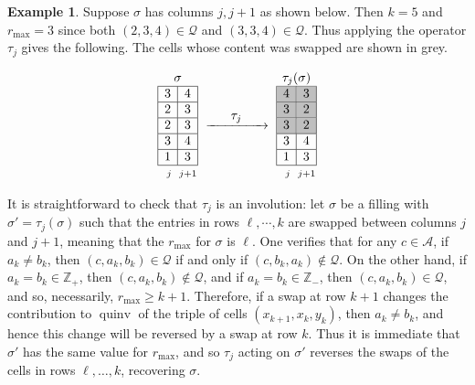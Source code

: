 \documentclass[11pt]{article}
\theoremstyle{definition}
\newtheorem{example}[theo]{Example}
\numberwithin{equation}{section}
\DeclareMathOperator{\quinv}{quinv}
\newcommand{\cQ}{\mathcal{Q}}
\begin{document}
\begin{example}\label{ex:tau}
Suppose $\sigma$ has columns $j,j+1$ as shown below. Then $k=5$ and $r_{\max}=3$ since both $(2,3,4)\in\cQ$ and $(3,3,4)\in\cQ$. Thus applying the operator $\tau_j$ gives the following. The cells whose content was swapped are shown in grey.


\begin{equation*}
\renewcommand{\arraystretch}{1}  
\setlength{\arraycolsep}{1pt} 
\begin{array}{|c|c|}
\multicolumn{2}{c}{\sigma}
\\
\hline
3 &  4\\
\hline
2 & 3  \\
\hline
2 & 3 \\
\hline
3 & 4\\
\hline
1 & 3 \\
\hline
\multicolumn{1}{c}{\scriptstyle \phantom{+} j\phantom{1}}&
\multicolumn{1}{c}{\scriptstyle j+1}
\end{array}
\,\,\xrightarrow{\makebox[1.5cm]{$\tau_j$}}\,\,
\begin{array}{|c|c|}
\multicolumn{2}{c}{\tau_j(\sigma)}
\\
\hline
\cellcolor{gray!50}4 & \cellcolor{gray!50} 3\\
\hline
\cellcolor{gray!50}3 & \cellcolor{gray!50}2  \\
\hline
\cellcolor{gray!50}3 & \cellcolor{gray!50}2 \\
\hline
3 & 4\\
\hline
1 & 3 \\
\hline
\multicolumn{1}{c}{\scriptstyle \phantom{+} j\phantom{1}}&
\multicolumn{1}{c}{\scriptstyle j+1}
\end{array}
\end{equation*}

\end{example}

It is straightforward to check that $\tau_j$ is an involution: let $\sigma$ be a filling with $\sigma'=\tau_j(\sigma)$ such that the entries in rows $\ell,\cdots,k$ are swapped between columns $j$ and $j+1$, meaning that the $r_{\max}$ for $\sigma$ is $\ell$. One verifies that for any $c\in\mathcal{A}$, if $a_k\neq b_k$, then $(c,a_{k},b_{k})\in\cQ$ if and only if $(c,b_k,a_k)\not\in\cQ$. On the other hand, if $a_k= b_k\in\mathbb{Z}_+$, then $(c,a_{k},b_{k}) \not\in\cQ$, and if $a_k= b_k\in\mathbb{Z}_-$, then $(c,a_{k},b_{k})\in\cQ$, and so, necessarily, $r_{\max}\geq k+1$. Therefore, if a swap at row $k+1$ changes the contribution to $\quinv$ of the triple of cells $(x_{k+1},x_k,y_k)$, then $a_k\neq b_k$, and hence this change will be reversed by a swap at row $k$. Thus it is immediate that $\sigma'$ has the same value for $r_{\max}$, and so $\tau_j$ acting on $\sigma'$ reverses the swaps of the cells in rows $\ell,\dots,k$, recovering $\sigma$. 
\end{document}

